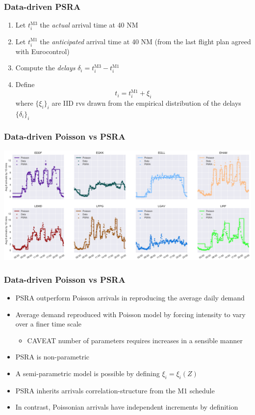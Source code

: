 \documentclass[table,aspectratio=169]{beamer}
\begin{document}
\begin{frame}[t]\frametitle{Data-driven PSRA}
    \begin{enumerate}
        \item Let $t^{\mathrm{M3}}_i$ the \alert{\emph{actual} arrival} time at 40 NM
        \item Let $t^{\mathrm{M1}}_i$ the \alert{\emph{anticipated} arrival} time at 40 NM (from the last flight plan agreed with Eurocontrol)
        \item Compute the \emph{delays} $\delta_i = t^{\mathrm{M3}}_i - t^{\mathrm{M1}}_i$
        \item Define
        \[t_i = t^{\mathrm{M1}}_i + \xi_i\]
        where $\{\xi_i\}_i$ are IID rvs drawn from the empirical distribution of the delays $\{\delta_i\}_i$
    \end{enumerate}
\end{frame}

\begin{frame}[t]\frametitle{Data-driven Poisson vs PSRA}
    \centering
    \includegraphics[width=.9\textwidth]{mean_simul_arrivals}
\end{frame}

\begin{frame}[t]\frametitle{Data-driven Poisson vs PSRA}
    \begin{itemize}
        \item PSRA outperform Poisson arrivals in reproducing the average daily demand
        \item Average demand reproduced with Poisson model by \alert{forcing} intensity to vary over a finer time scale
        \begin{itemize}
            \item \alert{CAVEAT} number of parameters requires increases in a sensible manner
        \end{itemize}
        \item PSRA is non-parametric
        \item A semi-parametric model is possible by defining $\xi_i = \xi_i(Z)$
        \item PSRA inherits \alert{arrivals correlation-structure} from the M1 schedule
        \item In contrast, Poissonian arrivals have \alert{independent increments} by definition
    \end{itemize}
\end{frame}
\end{document}
